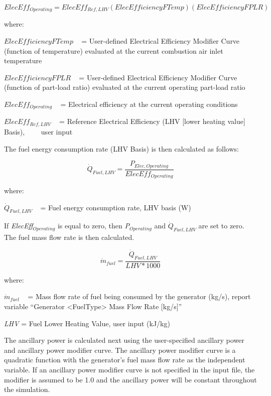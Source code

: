 \begin{equation}
ElecEf{f_{Operating}} = ElecEf{f_{Ref,LHV}}\left( {ElecEfficiencyFTemp} \right)\left( {ElecEfficiencyFPLR} \right)
\end{equation}

where:

\(ElecEfficiencyFTemp\) ~ = User-defined Electrical Efficiency Modifier Curve (function of temperature) evaluated at the current combustion air inlet temperature

\(ElecEfficiencyFPLR\) ~ = User-defined Electrical Efficiency Modifier Curve (function of part-load ratio) evaluated at the current operating part-load ratio

\(ElecEf{f_{Operating}}\) ~ = Electrical efficiency at the current operating conditions

\(ElecEf{f_{Ref,LHV}}\) ~ = Reference Electrical Efficiency (LHV {[}lower heating value{]} Basis),~~~~ user input

The fuel energy consumption rate (LHV Basis) is then calculated as follows:

\begin{equation}
\dot{Q}_{Fuel,LHV} = \frac{P_{Elec,Operating}}{ElecEff_{Operating}}
\end{equation}

where:

\({\dot Q_{Fuel,LHV}}\) ~ = Fuel energy consumption rate, LHV basis (W)

If \emph{ElecEff\(_{Operating}\)} is equal to zero, then \emph{P\(_{Operating}\)} and \({\dot Q_{Fuel,LHV}}\) are set to zero. The fuel mass flow rate is then calculated.

\begin{equation}
\dot{m}_{fuel} = \frac{\dot{Q}_{Fuel,LHV}}{LHV*1000}
\end{equation}

where:

\({\dot m_{fuel}}\) ~ = Mass flow rate of fuel being consumed by the generator (kg/s), report variable ``Generator \textless{}FuelType\textgreater{} Mass Flow Rate {[}kg/s{]}''

\emph{LHV} = Fuel Lower Heating Value, user input (kJ/kg)

The ancillary power is calculated next using the user-specified ancillary power and ancillary power modifier curve. The ancillary power modifier curve is a quadratic function with the generator's fuel mass flow rate as the independent variable. If an ancillary power modifier curve is not specified in the input file, the modifier is assumed to be 1.0 and the ancillary power will be constant throughout the simulation.

